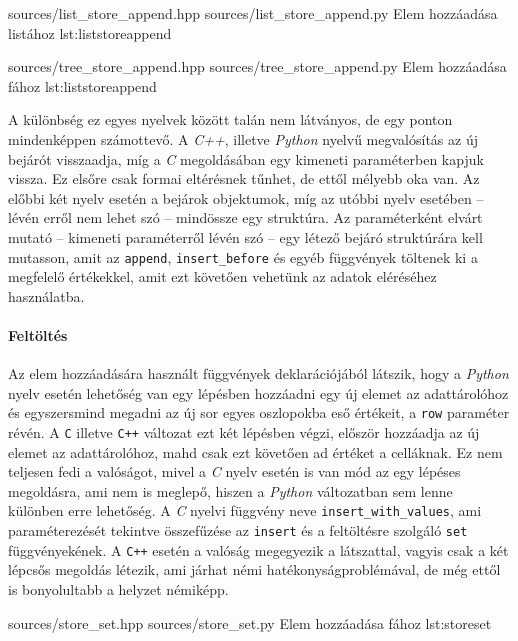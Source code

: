 {sources/list_store_append.hpp}
{sources/list_store_append.py}
{Elem hozzáadása listához}
{lst:liststoreappend}

{sources/tree_store_append.hpp}
{sources/tree_store_append.py}
{Elem hozzáadása fához}
{lst:liststoreappend}

A különbség ez egyes nyelvek között talán nem látványos, de egy ponton mindenképpen számottevő. A \textit{C++}, illetve \textit{Python} nyelvű megvalósítás az új bejárót visszaadja, míg a \textit{C} megoldásában egy kimeneti paraméterben kapjuk vissza. Ez elsőre csak formai eltérésnek tűnhet, de ettől mélyebb oka van. Az előbbi két nyelv esetén a bejárok objektumok, míg az utóbbi nyelv esetében -- lévén erről nem lehet szó -- mindössze egy struktúra. Az paraméterként elvárt mutató -- kimeneti paraméterről lévén szó -- egy létező bejáró struktúrára kell mutasson, amit az \texttt{append}, \texttt{insert\_before} és egyéb függvények töltenek ki a megfelelő értékekkel, amit ezt követően vehetünk az adatok eléréséhez használatba.

\paragraph{Feltöltés}

Az elem hozzáadására használt függvények deklarációjából látszik, hogy a \textit{Python} nyelv esetén lehetőség van egy lépésben hozzáadni egy új elemet az adattárolóhoz és egyszersmind megadni az új sor egyes oszlopokba eső értékeit, a \texttt{row} paraméter révén. A \texttt{C} illetve \texttt{C++} változat ezt két lépésben végzi, először hozzáadja az új elemet az adattárolóhoz, mahd csak ezt követően ad értéket a celláknak. Ez nem teljesen fedi a valóságot, mivel a \textit{C} nyelv esetén is van mód az egy lépéses megoldásra, ami nem is meglepő, hiszen a \textit{Python} változatban sem lenne különben erre lehetőség. A \textit{C} nyelvi függvény neve \texttt{insert\_with\_values}, ami paraméterezését tekintve összefűzése az \texttt{insert} és a feltöltésre szolgáló \texttt{set} függvényekének. A \texttt{C++} esetén a valóság megegyezik a látszattal, vagyis csak a két lépcsős megoldás létezik, ami járhat némi hatékonyságproblémával, de még ettől is bonyolultabb a helyzet némiképp.

{sources/store_set.hpp}
{sources/store_set.py}
{Elem hozzáadása fához}
{lst:storeset}


